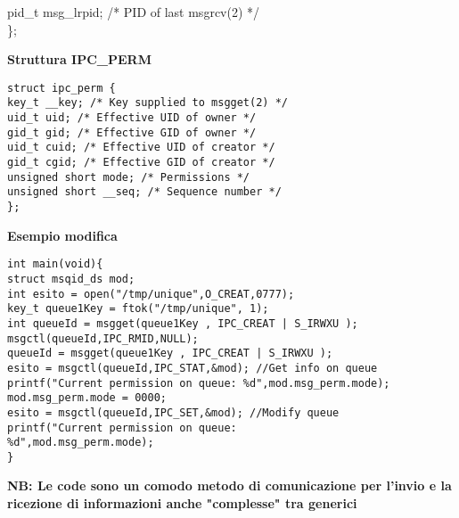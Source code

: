 \begin{flushleft}
\begin{flushleft}
\begin{flushleft}
{              \halftab pid\_t msg\_lrpid; /* PID of last msgrcv(2) */\\
        \};}
    \end{flushleft}
    \begin{flushleft}
      \textbf{Struttura IPC\_PERM}\par 
      \texttt{struct ipc\_perm \{ \\
              \halftab key\_t \_\_key; /* Key supplied to msgget(2) */\\
              \halftab uid\_t uid; /* Effective UID of owner */\\
              \halftab gid\_t gid; /* Effective GID of owner */\\
              \halftab uid\_t cuid; /* Effective UID of creator */\\
              \halftab gid\_t cgid; /* Effective GID of creator */\\
              \halftab unsigned short mode; /* Permissions */\\
              \halftab unsigned short \_\_seq; /* Sequence number */\\
        \};}
    \end{flushleft}
    \begin{flushleft}
      \textbf{Esempio modifica}\par 
      \texttt{int main(void)\{ \\
        \halftab struct msqid\_ds mod;\\
        \halftab int esito = open("/tmp/unique",O\_CREAT,0777);\\
        \halftab key\_t queue1Key = ftok("/tmp/unique", 1);\\
        \halftab int queueId = msgget(queue1Key , IPC\_CREAT | S\_IRWXU );\\
        \halftab msgctl(queueId,IPC\_RMID,NULL);\\
        \halftab queueId = msgget(queue1Key , IPC\_CREAT | S\_IRWXU ); \\
        \halftab esito = msgctl(queueId,IPC\_STAT,\&mod); //Get info on queue\\
        \halftab printf("Current permission on queue: \%d\n",mod.msg\_perm.mode);\\
        \halftab mod.msg\_perm.mode = 0000;\\
        \halftab esito = msgctl(queueId,IPC\_SET,\&mod); //Modify queue\\
        \halftab printf("Current permission on queue: 
                        \\ \tab \tab \%d\n\n",mod.msg\_perm.mode);\\
        \} }
    \end{flushleft}
  \end{flushleft}
  \textbf{NB: Le code sono un comodo metodo di comunicazione per l'invio e la ricezione di 
  informazioni anche "complesse" tra generici}
\end{flushleft}
